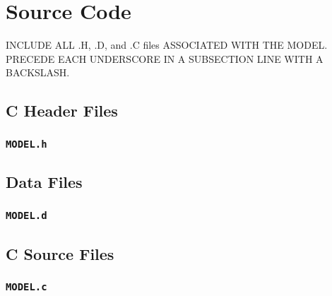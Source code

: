 \documentclass[twoside,11pt,titlepage]{report}
\begin{document}
\newpage
{}



\newpage
{}
\appendix


\chapter{Source Code}\label{sec:source_code}
INCLUDE ALL .H, .D, and .C files ASSOCIATED WITH THE MODEL.
PRECEDE EACH UNDERSCORE IN A SUBSECTION LINE WITH A BACKSLASH.

\section{C Header Files}

\subsection{\texorpdfstring{\tt MODEL.h}{MODEL.h}}
% 
\pagebreak

\section{Data Files}
\subsection{\texorpdfstring{\tt MODEL.d}{MODEL.d}}
% 
\pagebreak

\section{C Source Files}
\subsection{\texorpdfstring{\tt MODEL.c}{MODEL.c}}
% 
\pagebreak
\end{document}

